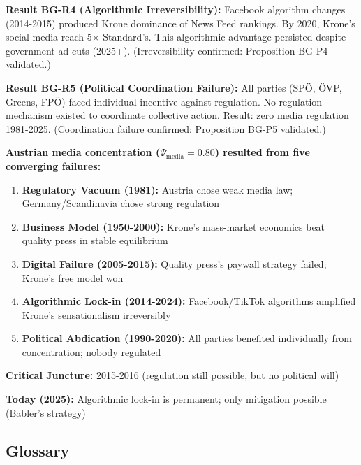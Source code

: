 {\textbf{Result BG-R4 (Algorithmic Irreversibility):}
Facebook algorithm changes (2014-2015) produced Krone dominance of News Feed rankings. By 2020,
Krone's social media reach 5× Standard's. This algorithmic advantage persisted despite government
ad cuts (2025+). (Irreversibility confirmed: Proposition BG-P4 validated.)

\textbf{Result BG-R5 (Political Coordination Failure):}
All parties (SPÖ, ÖVP, Greens, FPÖ) faced individual incentive against regulation. No regulation
mechanism existed to coordinate collective action. Result: zero media regulation 1981-2025.
(Coordination failure confirmed: Proposition BG-P5 validated.)

\begin{tcolorbox}[colback=green!5!white, colframe=green!75!black,
    title=Summary: Five Causes of Austrian Media Concentration]

\textbf{Austrian media concentration ($\Psi_{\text{media}} = 0.80$) resulted from five converging failures:}

\begin{enumerate}
\item \textbf{Regulatory Vacuum (1981):} Austria chose weak media law; Germany/Scandinavia chose strong regulation
\item \textbf{Business Model (1950-2000):} Krone's mass-market economics beat quality press in stable equilibrium
\item \textbf{Digital Failure (2005-2015):} Quality press's paywall strategy failed; Krone's free model won
\item \textbf{Algorithmic Lock-in (2014-2024):} Facebook/TikTok algorithms amplified Krone's sensationalism irreversibly
\item \textbf{Political Abdication (1990-2020):} All parties benefited individually from concentration; nobody regulated
\end{enumerate}

\textbf{Critical Juncture:} 2015-2016 (regulation still possible, but no political will)

\textbf{Today (2025):} Algorithmic lock-in is permanent; only mitigation possible (Babler's strategy)

\end{tcolorbox}


\subsection*{Glossary}

}
